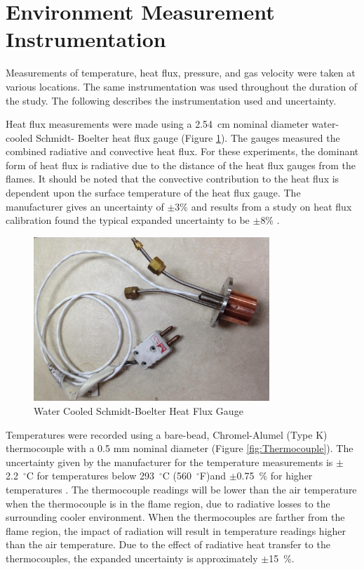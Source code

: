 \documentclass[12pt,oneside]{book}
\begin{document}
\clearpage

\section{Environment Measurement Instrumentation}

Measurements of temperature, heat flux, pressure, and gas velocity were taken at various locations. The same instrumentation was used throughout the duration of the study. The following describes the instrumentation used and uncertainty.

Heat flux measurements were made using a 2.54~cm nominal diameter water-cooled Schmidt- Boelter heat flux gauge (Figure \ref{fig:HeatFluxGauge}). The gauges measured the combined radiative and convective heat flux. For these experiments, the dominant form of heat flux is radiative due to the distance of the heat flux gauges from the flames. It should be noted that the convective contribution to the heat flux is dependent upon the surface temperature of the heat flux gauge. The manufacturer gives an uncertainty of $\pm$3\% and results from a study on heat flux calibration found the typical expanded uncertainty to be $\pm$8\% \cite{HeatFluxRoundRobin}.

\begin{figure} [H]
	\centering
	\includegraphics[width = 3.5in]{0_Images/Instrumentation/Heat_Flux_Gauge.jpg}
	\caption{Water Cooled Schmidt-Boelter Heat Flux Gauge}
	\label{fig:HeatFluxGauge}
\end{figure}

Temperatures were recorded using a bare-bead, Chromel-Alumel (Type K) thermocouple with a 0.5 mm nominal diameter (Figure \ref{fig:Thermocouple}). The uncertainty given by the manufacturer for the temperature measurements is $\pm$2.2~$^\circ$C for temperatures below 293~$^\circ$C (560~$^\circ$F)and $\pm$0.75~\% for higher temperatures \cite{TemperatureHandbook}. The thermocouple readings will be lower than the air temperature when the thermocouple is in the flame region, due to radiative losses to the surrounding cooler environment. When the thermocouples are farther from the flame region, the impact of radiation will result in temperature readings higher than the air temperature. Due to the effect of radiative heat transfer to the thermocouples, the expanded uncertainty is approximately $\pm$15~\%.
\end{document}

